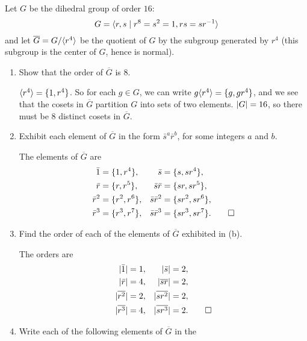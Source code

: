  Let $G$ be the dihedral group of order $16$:
\begin{equation*}
  G = \langle{r,s\mid r^8 = s^2 = 1, rs = sr^{-1}}\rangle
\end{equation*}
and let $\overline{G} = G/\langle{r^4}\rangle$ be the quotient of $G$ by the
subgroup generated by $r^4$ (this subgroup is the center of $G$, hence
is normal).
\begin{enumerate}
\item Show that the order of $\overline{G}$ is $8$.
  \begin{solution}
    $\langle{r^4}\rangle = \{1, r^4\}$. So for each $g\in G$, we can write
    $g\langle{r^4}\rangle = \{g, gr^4\}$, and we see that the cosets in
    $\overline{G}$ partition $G$ into sets of two elements.
    $\lvert{G}\rvert = 16$, so there must be $8$ distinct cosets in
    $\overline{G}$.
  \end{solution}
\item Exhibit each element of $\overline{G}$ in the form
  $\bar s^a\bar r^b$, for some integers $a$ and $b$.
  \begin{solution}
    The elements of $\overline{G}$ are
    \begin{align*}
      \bar1 &= \{1, r^4\}, & \bar{s} &= \{s, sr^4\}, \\
      \bar{r} &= \{r, r^5\}, & \bar{s}\bar{r} &= \{sr, sr^5\}, \\
      \bar{r}^2 &= \{r^2, r^6\}, & \bar{s}\bar{r}^2 &= \{sr^2, sr^6\}, \\
      \bar{r}^3 &= \{r^3, r^7\}, & \bar{s}\bar{r}^3 &= \{sr^3, sr^7\}.
                                                      \qedhere
    \end{align*}
  \end{solution}
\item Find the order of each of the elements of $\overline{G}$
  exhibited in (b).
  \begin{solution}
    The orders are
    \begin{align*}
      \lvert{\bar1}\rvert &= 1, & \lvert{\bar{s}}\rvert &= 2, \\
      \lvert{\bar{r}}\rvert &= 4, & \lvert{\overline{sr}}\rvert &= 2, \\
      \lvert{\overline{r^2}}\rvert &= 2, & \lvert{\overline{sr^2}}\rvert &= 2, \\
      \lvert{\overline{r^3}}\rvert &= 4, & \lvert{\overline{sr^3}}\rvert &= 2. \qedhere
    \end{align*}
  \end{solution}
\item Write each of the following elements of $\overline{G}$ in the

\end{enumerate}
